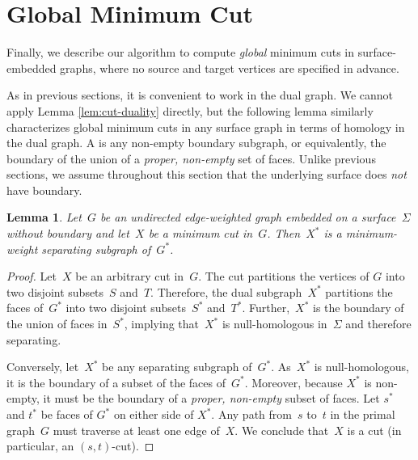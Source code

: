 \documentclass[11pt,twoside]{article}
\def\Cut{X}
\newtheorem{lemma}[theorem]{Lemma}
\begin{document}
{\section{Global Minimum Cut}
\label{sec:global}


Finally, we describe our algorithm to compute \emph{global} minimum cuts in surface-embedded graphs, where no source and target vertices are specified in advance.  

As in previous sections, it is convenient to work in the dual graph.  We cannot apply Lemma \ref{lem:cut-duality} directly, but the following lemma similarly characterizes global minimum cuts in any surface graph in terms of homology in the dual graph.  A  is any non-empty boundary subgraph, or equivalently, the boundary of the union of a \emph{proper, non-empty} set of faces.  Unlike previous sections, we assume throughout this section that the underlying surface does \emph{not} have boundary. 


\begin{lemma}
\label{lem:mincut-z2}
Let~$G$ be an undirected edge-weighted graph embedded on a surface~$\Sigma$ without boundary and let~$\Cut$ be a minimum cut in~$G$.  Then~$\Cut^*$ is a minimum-weight separating subgraph of~$G^*$.
\end{lemma}

\begin{proof}
  Let~$\Cut$ be an arbitrary cut in~$G$.  The cut partitions the vertices of $G$
  into two disjoint subsets~$S$ and~$T$. Therefore, the dual subgraph~$\Cut^*$
  partitions the faces of~$G^*$ into two disjoint subsets~$S^*$ and~$T^*$.
  Further,~$\Cut^*$ is the boundary of the union of faces in~$S^*$, implying
  that~$\Cut^*$ is null-homologous in~$\Sigma$ and therefore separating.

  Conversely, let~$\Cut^*$ be any separating subgraph of~$G^*$.
  As~$\Cut^*$ is null-homologous, it is the boundary of a subset of the faces
  of~$G^*$.  Moreover, because $\Cut^*$ is non-empty, it must be the boundary of
  a \emph{proper, non-empty} subset of faces.  Let $s^*$ and $t^*$ be faces
  of $G^*$ on either side of $\Cut^*$.  Any path from~$s$ to~$t$ in the primal
  graph~$G$ must traverse at least one edge of~$\Cut$.  We conclude that~$\Cut$ is
  a cut (in particular, an $(s,t)$-cut).
\end{proof}

}
\end{document}
